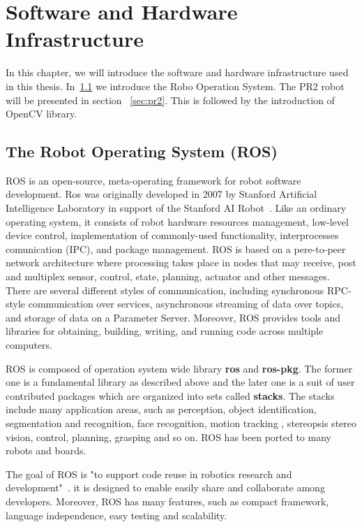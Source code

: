 \chapter{Software and Hardware Infrastructure}
\label{chapter:SHI}
In this chapter, we will introduce the software and hardware
infrastructure used in this thesis. In~\ref{sec:ros} we introduce the
Robo Operation System. The PR2 robot will be presented in section
~\ref{sec:pr2}. This is followed by the introduction of OpenCV library.

\section{The Robot Operating System (ROS)}
\label{sec:ros}
ROS is an open-source, meta-operating framework for robot software
development. Ros was originally developed in 2007 by Stanford Artificial Intelligence Laboratory in support of the Stanford AI Robot~\cite{quigley2007stair}. Like an ordinary operating system, it consists of  robot
hardware resources management, low-level device control, implementation
of commonly-used functionality, interprocesses comunication (IPC), and package
management. ROS is based on a pere-to-peer network architecture where
processing takes place in nodes that may receive, post and 
multiplex sensor, control, state, planning, actuator and other
messages. There are several different styles of communication, including synchronous RPC-style communication over services, asynchronous
streaming of data over topics, and storage of data on a Parameter
Server.
Moreover, ROS provides tools and libraries for obtaining, building, writing, and
running code across multiple computers.

ROS is composed of operation system wide library \textbf{ros} and
\textbf{ros-pkg}. The former one is a fundamental library as described
above and the later one is a suit of user contributed packages which
are organized into sets called \textbf{stacks}. The stacks include
many application areas, such as  perception, object identification,
segmentation and recognition, face recognition, motion tracking ,
stereopsis stereo vision, control, planning, grasping and so on. ROS has been ported to many robots and boards.

The goal of ROS is "to support code reuse in robotics research and
development"~\cite{rosintroduction}.  it is designed to enable easily
share and collaborate among developers. Moreover, ROS has many
features, such as compact framework, language independence, easy
testing and scalability.


